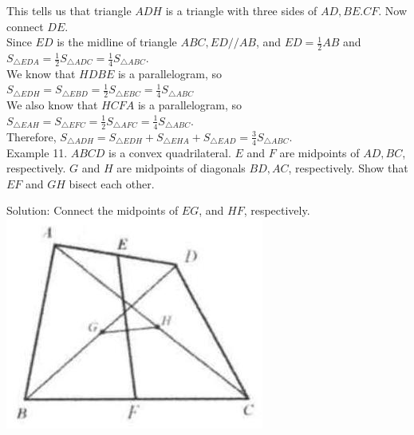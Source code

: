 \documentclass[10pt]{article}
\begin{document}
This tells us that triangle \(A D H\) is a triangle with three sides of \(A D, B E . C F\). Now connect \(D E\).\\
Since \(E D\) is the midline of triangle \(A B C, E D / / A B\), and \(E D=\frac{1}{2} A B\) and \(S_{\triangle E D A}=\frac{1}{2} S_{\triangle A D C}=\frac{1}{4} S_{\triangle A B C}\).\\
We know that \(H D B E\) is a parallelogram, so \(S_{\triangle E D H}=S_{\triangle E B D}=\frac{1}{2} S_{\triangle E B C}=\frac{1}{4} S_{\triangle A B C}\)\\
We also know that \(H C F A\) is a parallelogram, so\\
\(S_{\triangle E A H}=S_{\triangle E F C}=\frac{1}{2} S_{\triangle A F C}=\frac{1}{4} S_{\triangle A B C}\).\\
Therefore, \(S_{\triangle A D H}=S_{\triangle E D H}+S_{\triangle E H A}+S_{\triangle E A D}=\frac{3}{4} S_{\triangle A B C}\).\\
Example 11. \(A B C D\) is a convex quadrilateral. \(E\) and \(F\) are midpoints of \(A D, B C\), respectively. \(G\) and \(H\) are midpoints of diagonals \(B D, A C\), respectively. Show that \(E F\) and \(G H\) bisect each other.

Solution:
Connect the midpoints of \(E G\), and \(H F\), respectively.\\
\includegraphics[max width=\textwidth, center]{2025_04_17_97bc1f7e44d93c271a88g-041(1)}
\end{document}
